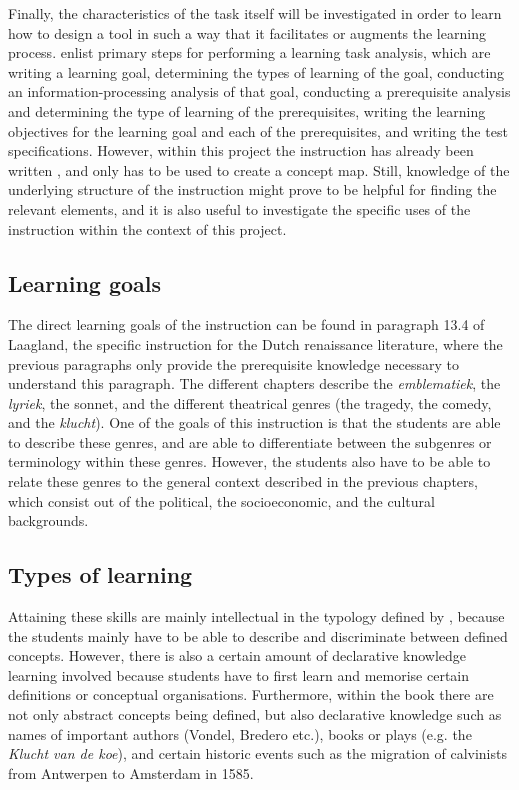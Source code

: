 Finally, the characteristics of the task itself will be investigated in order to learn how to design a tool in such a way that it facilitates or augments the learning process.  enlist primary steps for performing a learning task analysis, which are writing a learning goal, determining the types of learning of the goal, conducting an information-processing analysis of that goal, conducting a prerequisite analysis and determining the type of learning of the prerequisites, writing the learning objectives for the learning goal and each of the prerequisites, and writing the test specifications. However, within this project the instruction has already been written \cite{laagland}, and only has to be used to create a concept map. Still, knowledge of the underlying structure of the instruction might prove to be helpful for finding the relevant elements, and it is also useful to investigate the specific uses of the instruction within the context of this project.

\subsection{Learning goals}

The direct learning goals of the instruction can be found in paragraph 13.4 of Laagland, the specific instruction for the Dutch renaissance literature, where the previous paragraphs only provide the prerequisite knowledge necessary to understand this paragraph. The different chapters describe the \emph{emblematiek}, the \emph{lyriek}, the sonnet, and the different theatrical genres (the tragedy, the comedy, and the \emph{klucht}). One of the goals of this instruction is that the students are able to describe these genres, and are able to differentiate between the subgenres or terminology within these genres. However, the students also have to be able to relate these genres to the general context described in the previous chapters, which consist out of the political, the socioeconomic, and the cultural backgrounds.

\subsection{Types of learning}

Attaining these skills are mainly intellectual in the typology defined by , because the students mainly have to be able to describe and discriminate between defined concepts. However, there is also a certain amount of declarative knowledge learning involved because students have to first learn and memorise certain definitions or conceptual organisations. Furthermore, within the book there are not only abstract concepts being defined, but also declarative knowledge such as names of important authors (Vondel, Bredero etc.), books or plays (e.g. the \emph{Klucht van de koe}), and certain historic events such as the migration of calvinists from Antwerpen to Amsterdam in 1585.

